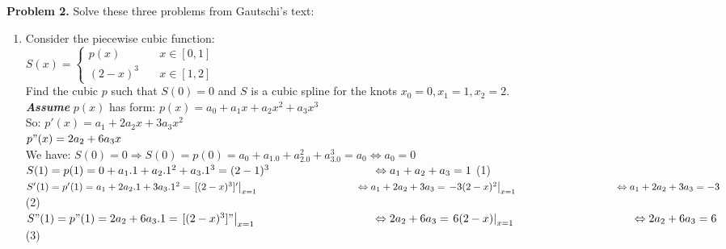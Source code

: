 \documentclass[14pt,a4paper]{article}
\begin{document}
\label{Problem 2}
\large\textbf{Problem 2.} Solve these three problems from Gautschi's text:
\begin{enumerate}
	\label{2a}
	\item Consider the piecewise cubic function:\\
	\hspace*{5cm} $S(x) = \begin{cases} p(x) & \quad x \in [0,1] \\ (2-x)^3 & \quad x \in [1,2] \end{cases}$\\
	Find the cubic $p$ such that $S(0) = 0$ and $S$ is a cubic spline for the knots $x_0 = 0, x_1 = 1, x_2 = 2$. \\
	\textbf{\textit{Assume}} $p(x)$ has form: \hspace{1cm} $p(x) = a_0 + a_1x + a_2x^2 + a_3x^3$\\
	So: \hspace{4.9cm} $p'(x) = a_1 + 2a_2x + 3a_3x^2$\\
	\hspace*{5.65cm} $p"(x) = 2a_2 + 6a_3x$\\
	We have: $S(0) =0 \Rightarrow S(0) = p(0) = a_0 + a_1.0 + a_2.0^2 + a_3.0^3 = a_0 \Leftrightarrow a_0 = 0$ \\
	\hspace*{1cm} $S(1) = p(1) = 0 + a_1.1 + a_2.1^2 + a_3.1^3 = (2-1)^3 \\
	\hspace*{3.2cm} \Leftrightarrow a_1 + a_2 + a_3 = 1$ \hspace{5cm} (1) \\
	\hspace*{1cm} $S'(1) = p'(1) = a_1 + 2a_2.1 + 3a_3.1^2 = \left.[(2-x)^3]' \right|_{x=1} \\
	\hspace*{3.4cm} \Leftrightarrow a_1 + 2a_2 + 3a_3 = \left. -3(2-x)^2\right|_{x=1}\\
	\hspace*{3.4cm} \Leftrightarrow a_1 + 2a_2 + 3a_3 = -3$ \hspace{4.1cm} (2) \\
	\hspace*{1cm} $S"(1) = p"(1) = 2a_2 + 6a_3.1 = \left.[(2-x)^3]"\right|_{x=1} \\
	\hspace*{3.6cm} \Leftrightarrow 2a_2 + 6a_3 = \left. 6(2-x)\right|_{x=1}\\
	\hspace*{3.6cm} \Leftrightarrow 2a_2 + 6a_3 = 6$ \hspace{5.2cm} (3) \\

\end{enumerate}
\end{document}
